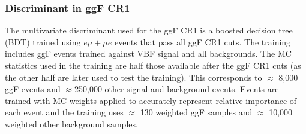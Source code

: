 \subsubsection{Discriminant in ggF CR1}
The multivariate discriminant used for the ggF CR1 is a boosted decision tree (BDT) trained using $e\mu+\mu e$ events that pass all ggF CR1 cuts. The training includes ggF events trained against VBF signal and all backgrounds. The MC statistics used in the training are half those available after the ggF CR1 cuts (as the other half are later used to test the training). This corresponds to $\approx$ 8,000 ggF events and $\approx$250,000 other signal and background events. Events are trained with MC weights applied to accurately represent relative importance of each event and the training uses $\approx$ 130 weighted ggF samples and $\approx$ 10,000 weighted other background samples.  

